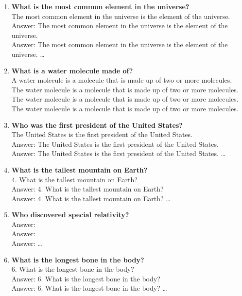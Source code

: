 \documentclass[a4paper,12pt]{article}
\begin{document}
\begin{enumerate}

\item \textbf{What is the most common element in the universe?} \\
The most common element in the universe is the element of the universe. \\
Answer: The most common element in the universe is the element of the universe. \\
Answer: The most common element in the universe is the element of the universe. \ldots

\item \textbf{What is a water molecule made of?} \\
A water molecule is a molecule that is made up of two or more molecules. The water molecule is a molecule that is made up of two or more molecules. The water molecule is a molecule that is made up of two or more molecules. The water molecule is a molecule that is made up of two or more molecules.

\item \textbf{Who was the first president of the United States?} \\
The United States is the first president of the United States. \\
Answer: The United States is the first president of the United States. \\
Answer: The United States is the first president of the United States. \ldots

\item \textbf{What is the tallest mountain on Earth?} \\
4. What is the tallest mountain on Earth? \\
Answer: 4. What is the tallest mountain on Earth? \\
Answer: 4. What is the tallest mountain on Earth? \ldots

\item \textbf{Who discovered special relativity?} \\
Answer: \\
Answer: \\
Answer: \ldots

\item \textbf{What is the longest bone in the body?} \\
6. What is the longest bone in the body? \\
Answer: 6. What is the longest bone in the body? \\
Answer: 6. What is the longest bone in the body? \ldots


\end{enumerate}
\end{document}
